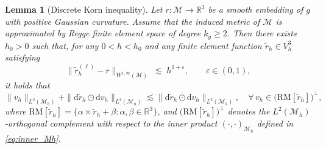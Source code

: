 \documentclass[11pt,a4paper,oneside,reqno]{amsart}
\theoremstyle{definition}
\theoremstyle{plain}
\newtheorem{lemma}{Lemma}
\numberwithin{theorem}{section}
\numberwithin{proposition}{section}
\numberwithin{lemma}{section}
\numberwithin{equation}{section}
\newcommand{\Man}{\mathcal{M}}
\newcommand{\RM}{\mathrm{RM}}
\begin{document}
\begin{lemma}[Discrete Korn inequality]\label{lm:dis_Korn}
Let \(r:\Man \rightarrow \mathbb{R}^3\) be a smooth embedding of $g$ with positive Gaussian curvature. Assume that the induced metric of \(\Man\) is approximated by Regge finite element space of degree \(k_g\ge2\). Then there exists \(h_0>0\) such that, for any \(0<h<h_0\) and any finite element function \(\tilde r_h\in V_h^3\) satisfying
\begin{equation}\label{eq:dis_Korn_cond} 
\| \tilde r_h^{(\ell)}-r\|_{W^{1,\infty}(\Man)}\;\lesssim\; h^{1+\varepsilon},\qquad \varepsilon\in(0,1),
\end{equation} 
it holds that
\begin{equation}\label{eq:dis_Korn} 
 \|v_h\|_{L^2(\Man_h)}
+ \|\mathrm{d}\tilde r_h \odot \mathrm{d}v_h\|_{L^2(\Man_h)}
\lesssim  \|\mathrm{d}\tilde r_h \odot \mathrm{d}v_h\|_{L^2(\Man_h)} 
, \quad \forall\, v_h \in \big(\RM[\tilde r_h]\big)^{\perp},
\end{equation} 
where \(\RM[\tilde r_h]=\{\alpha\times \tilde r_h+\beta:\alpha,\beta\in\mathbb{R}^3\}\), and \(\big(\RM[\tilde r_h]\big)^{\perp}\) denotes the \(L^2(\Man_h)\)-orthogonal complement with respect to the inner product \((\cdot,\cdot)_{\Man_h}\) defined in \eqref{eq:inner_Mh}.
\end{lemma}
\end{document}
